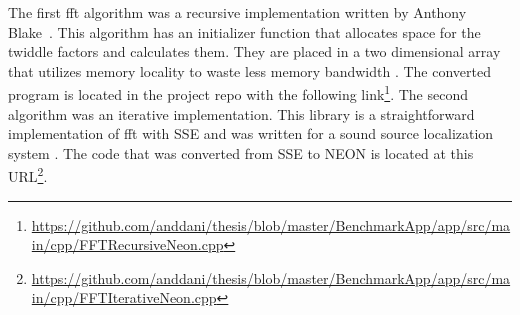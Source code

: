 The first \gls{fft} algorithm was a recursive implementation written by Anthony Blake~\cite{neon:recursive}. This algorithm has an initializer function that allocates space for the twiddle factors and calculates them. They are placed in a two dimensional array that utilizes memory locality to waste less memory bandwidth \cite{neon:recursive:details}. The converted program is located in the project repo with the following link\footnote{\url{https://github.com/anddani/thesis/blob/master/BenchmarkApp/app/src/main/cpp/FFTRecursiveNeon.cpp}}. The second algorithm was an iterative implementation. This library is a straightforward implementation of \gls{fft} with SSE \cite{code:manyears} and was written for a sound source localization system \cite{manyears:site}. The code that was converted from SSE to NEON is located at this URL\footnote{\url{https://github.com/anddani/thesis/blob/master/BenchmarkApp/app/src/main/cpp/FFTIterativeNeon.cpp}}.
